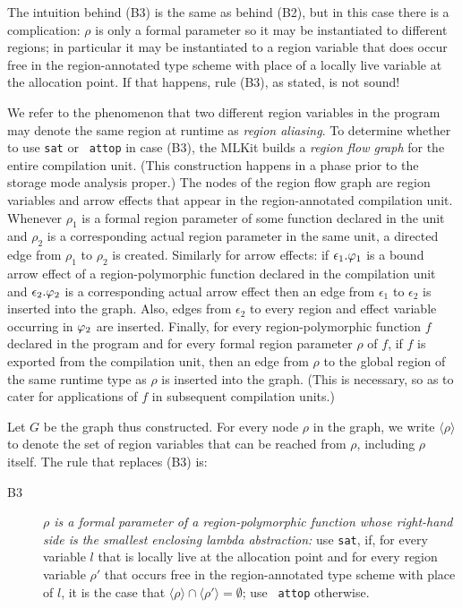 \documentclass[12pt]{book}
\begin{document}
The intuition behind (B3) is the same as behind (B2), but in this case
there is a complication: $\rho$ is only a formal parameter so it may
be instantiated to different regions; in particular it may be
instantiated to a region variable that does occur free in the
region-annotated type scheme with place of a locally live variable at
the allocation point. If that happens, rule (B3), as stated, is not
sound!

We refer to the phenomenon that two different region variables in the
program may denote the same region at runtime as
%
{\em region aliasing}. To determine whether to use {\tt sat} or {\tt
  attop} in case (B3), the MLKit builds a
%
\label{region flow graph}%
{\em region flow graph\/} for the entire compilation unit. (This
construction happens in a phase prior to the storage mode analysis
proper.)  The nodes of the region flow graph are region variables and
arrow effects that appear in the region-annotated compilation unit.
Whenever $\rho_1$ is a formal region parameter of some function
declared in the unit and $\rho_2$ is a corresponding actual region
parameter in the same unit, a directed edge from $\rho_1$ to $\rho_2$
is created. Similarly for arrow effects: if $\epsilon_1.\varphi_1$ is a
bound arrow effect of a region-polymorphic function declared in the
compilation unit and $\epsilon_2.\varphi_2$ is a corresponding actual
arrow effect then an edge from $\epsilon_1$ to $\epsilon_2$ is
inserted into the graph.  Also, edges from $\epsilon_2$ to every
region and effect variable occurring in $\varphi_2$ are inserted.
Finally, for every region-polymorphic function $f$ declared in the
program and for every formal region parameter $\rho$ of $f$, if $f$ is
exported from the compilation unit, then an edge from $\rho$ to the
global region of the same runtime type as $\rho$ is inserted into the
graph. (This is necessary, so as to cater for applications of $f$ in
subsequent compilation units.)  

Let $G$ be the graph thus constructed.  For every node $\rho$ in the
graph, we write $\langle\rho\rangle$ to denote the set of region
variables that can be reached from $\rho$, including $\rho$ itself.
The rule that replaces (B3) is:
%
\begin{description}
\item[B3]{\it $\rho$ is a formal parameter of a region-polymorphic
    function whose right-hand side is the smallest enclosing lambda
    abstraction:} use {\tt sat}, if, for every variable $l$ that is
  locally live at the allocation point and for every region variable
  $\rho'$ that occurs free in the region-annotated type scheme with
  place of $l$, it is the case that
  $\langle\rho\rangle\cap\langle\rho'\rangle =\emptyset$; use {\tt
    attop} otherwise.
\end{description}
\medskip
\end{document}
